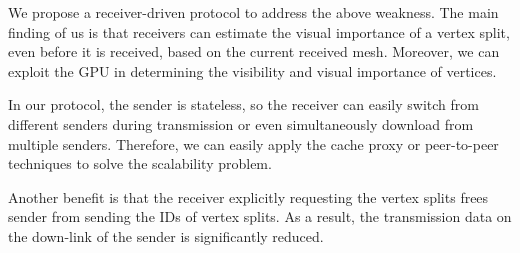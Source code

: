 We propose a receiver-driven protocol to address the above weakness.
The main finding of us is that %
receivers can estimate the visual importance of a vertex split, even before
it is received, based on the current received mesh. Moreover, we can exploit the GPU
in determining the visibility and visual importance of vertices.

In our protocol, the sender is stateless,  so the receiver can easily
switch from different senders during transmission or even simultaneously
download from multiple senders. Therefore, we can easily apply
the cache proxy or peer-to-peer techniques to solve the scalability problem. 

Another benefit is that the receiver explicitly requesting the vertex splits
frees sender from sending the IDs of vertex splits. As a result, the
transmission data on the down-link of the sender is significantly reduced. 
